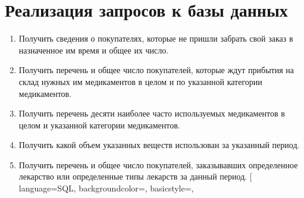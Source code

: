 \documentclass[a4paper]{article}
\begin{document}
	\section{Реализация запросов к базы данных}
		\begin{enumerate}			
			\item Получить сведения о покупателях, которые не пришли забрать свой заказ в назначенное им время и общее их число.
				
			\item Получить перечень и общее число покупателей, которые ждут прибытия на склад нужных им медикаментов в целом и по указанной категории медикаментов.
				
				
			\item Получить перечень десяти наиболее часто используемых медикаментов в целом и указанной категории медикаментов.
				
				
			\item  Получить какой объем указанных веществ использован за указанный период.
				
			\item Получить перечень и общее число покупателей, заказывавших определенное лекарство или определенные типы лекарств за данный период.
				[
					language=SQL,
					backgroundcolor=\color{backcolour},
					basicstyle=\scriptsize,

\end{enumerate}
\end{document}
